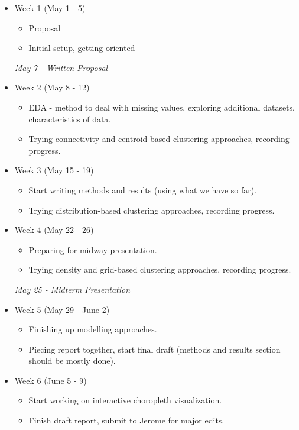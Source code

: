 \documentclass[11pt, a4paper]{article}
\begin{document}
\begin{itemize}
\item Week 1  \dotfill (May 1 - 5)
\begin{itemize}
\item Proposal
\item Initial setup, getting oriented
\end{itemize}

\textit{May 7 - Written Proposal}

\item Week 2  \dotfill (May 8 - 12)
\begin{itemize}
\item EDA - method to deal with missing values, exploring additional datasets, characteristics of data.
\item Trying connectivity and centroid-based clustering approaches, recording progress.
\end{itemize}

\item Week 3  \dotfill (May 15 - 19)
\begin{itemize}
\item Start writing methods and results (using what we have so far).
\item Trying distribution-based clustering approaches, recording progress.
\end{itemize}

\item Week 4  \dotfill (May 22 - 26)
\begin{itemize}
\item Preparing for midway presentation.
\item Trying density and grid-based clustering approaches, recording progress.
\end{itemize}

\textit{May 25 - Midterm Presentation}

\item Week 5  \dotfill (May 29 - June 2)
\begin{itemize}
\item Finishing up modelling approaches.
\item Piecing report together, start final draft (methods and results section should be mostly done).
\end{itemize}

\item Week 6  \dotfill (June 5 - 9)
\begin{itemize}
\item Start working on interactive choropleth visualization.
\item Finish draft report, submit to Jerome for major edits.
\end{itemize}


\end{itemize}
\end{document}
